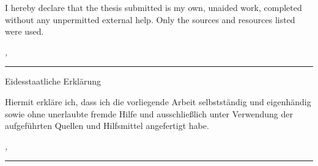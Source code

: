 %
\label{sec:affidavit}
\thispagestyle{empty}

I hereby declare that the thesis submitted is my own, unaided work, completed without any unpermitted external help. Only the sources and resources listed were used.

\bigskip

\noindent\textit{\thesisUniversityCity, \thesisDate}

\smallskip

\begin{flushright}
	\begin{minipage}{5cm}
		\rule{\textwidth}{1pt}
		\centering\thesisName
	\end{minipage}
\end{flushright}

\bigskip\bigskip\bigskip


{Eidesstaatliche Erklärung}
\bigskip\bigskip
\label{sec:eidesstaatliche-erklärung}
\thispagestyle{empty}

Hiermit erkläre ich, dass ich die vorliegende Arbeit selbstständig und eigenhändig sowie ohne unerlaubte fremde Hilfe und ausschließlich unter Verwendung der aufgeführten Quellen und Hilfsmittel angefertigt habe.


\noindent\textit{\thesisUniversityCity, \thesisDate}

\smallskip

\begin{flushright}
	\begin{minipage}{5cm}
		\rule{\textwidth}{1pt}
		\centering\thesisName
	\end{minipage}
\end{flushright}
